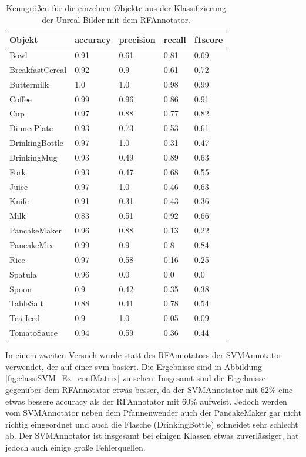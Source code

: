 \begin{table}
\begin{tabularx}{\textwidth}{Xllll}
\textbf{Objekt}	& \textbf{\gls{accuracy}} & \textbf{\gls{precision}}	& \textbf{\gls{recall}}	& \textbf{\gls{f1score}} \\ \hline
Bowl & 0.91 & 0.61 & 0.81 & 0.69 \\  
BreakfastCereal & 0.92 & 0.9 & 0.61 & 0.72 \\  
Buttermilk & 1.0 & 1.0 & 0.98 & 0.99 \\  
Coffee & 0.99 & 0.96 & 0.86 & 0.91 \\  
Cup & 0.97 & 0.88 & 0.77 & 0.82 \\  
DinnerPlate & 0.93 & 0.73 & 0.53 & 0.61 \\  
DrinkingBottle & 0.97 & 1.0 & 0.31 & 0.47 \\  
DrinkingMug & 0.93 & 0.49 & 0.89 & 0.63 \\  
Fork & 0.93 & 0.47 & 0.68 & 0.55 \\  
Juice & 0.97 & 1.0 & 0.46 & 0.63 \\  
Knife & 0.91 & 0.31 & 0.43 & 0.36 \\  
Milk & 0.83 & 0.51 & 0.92 & 0.66 \\  
PancakeMaker & 0.96 & 0.88 & 0.13 & 0.22 \\  
PancakeMix & 0.99 & 0.9 & 0.8 & 0.84 \\  
Rice & 0.97 & 0.58 & 0.16 & 0.25 \\  
Spatula & 0.96 & 0.0 & 0.0 & 0.0 \\  
Spoon & 0.9 & 0.42 & 0.35 & 0.38 \\  
TableSalt & 0.88 & 0.41 & 0.78 & 0.54 \\  
Tea-Iced & 0.9 & 1.0 & 0.05 & 0.09 \\  
TomatoSauce & 0.94 & 0.59 & 0.36 & 0.44 \\  
\end{tabularx}
\caption[Objekt spezifische Kenngrößen des RFAnnotators]{Kenngrößen für die einzelnen Objekte aus der Klassifizierung der Unreal-Bilder mit dem RFAnnotator.}
\label{tab:classiRF_Ex_classMetrics}
\end{table}

In einem zweiten Versuch wurde statt des RFAnnotators der SVMAnnotator verwendet, der auf einer \gls{svm} basiert. Die Ergebnisse sind in Abbildung  \ref{fig:classiSVM_Ex_confMatrix} zu sehen. Insgesamt sind die Ergebnisse gegenüber dem RFAnnotator etwas besser, da der SVMAnnotator mit 62\% eine etwas bessere \gls{accuracy} als der RFAnnotator mit 60\% aufweist. Jedoch werden vom SVMAnnotator neben dem Pfannenwender auch der PancakeMaker gar nicht richtig eingeordnet und auch die Flasche (DrinkingBottle) schneidet sehr schlecht ab. Der SVMAnnotator ist insgesamt bei einigen Klassen etwas zuverlässiger, hat jedoch auch einige große Fehlerquellen. 

